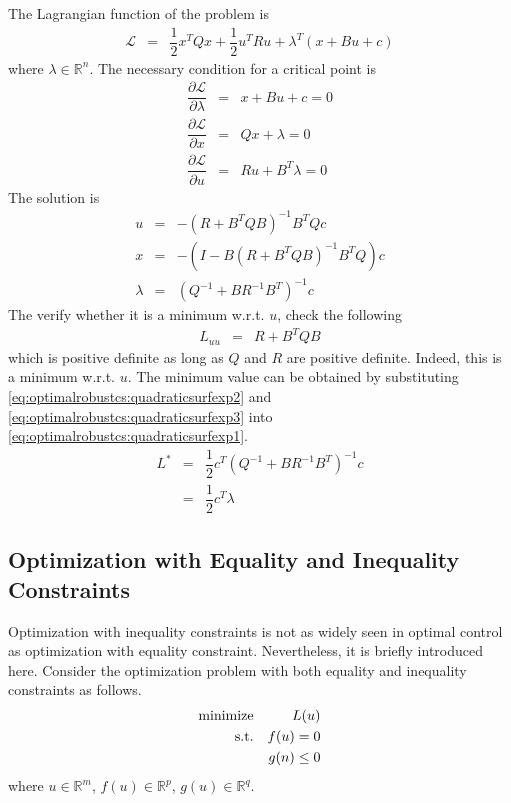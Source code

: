 The Lagrangian function of the problem is
\begin{eqnarray}
  \mathcal{L} &=& \dfrac{1}{2}x^TQx + \dfrac{1}{2}u^TRu + \lambda^T(x + Bu + c) \nonumber
\end{eqnarray}
where $\lambda \in\mathbb{R}^n$. The necessary condition for a critical point is
\begin{eqnarray}
  \dfrac{\partial \mathcal{L}}{\partial \lambda} &=& x + Bu + c = 0 \\
  \dfrac{\partial \mathcal{L}}{\partial x} &=& Qx + \lambda = 0 \\
  \dfrac{\partial \mathcal{L}}{\partial u} &=& Ru + B^T\lambda = 0 \nonumber
\end{eqnarray}
The solution is
\begin{eqnarray}
  u &=& -\left(R+B^TQB\right)^{-1}B^TQc \label{eq:optimalrobustcs:quadraticsurfexp2} \\
  x &=& -\left(I-B\left(R+B^TQB\right)^{-1}B^TQ\right)c \label{eq:optimalrobustcs:quadraticsurfexp3} \\
  \lambda &=& \left(Q^{-1}+BR^{-1}B^T\right)^{-1}c \nonumber
\end{eqnarray}
The verify whether it is a minimum w.r.t. $u$, check the following
\begin{eqnarray}
  L_{uu} &=& R+B^TQB \nonumber
\end{eqnarray}
which is positive definite as long as $Q$ and $R$ are positive definite. Indeed, this is a minimum w.r.t. $u$. The minimum value can be obtained by substituting \eqref{eq:optimalrobustcs:quadraticsurfexp2} and \eqref{eq:optimalrobustcs:quadraticsurfexp3} into \eqref{eq:optimalrobustcs:quadraticsurfexp1}.
\begin{eqnarray}
  L^* &=& \dfrac{1}{2}c^T\left(Q^{-1}+BR^{-1}B^T\right)^{-1}c \nonumber \\
  &=& \dfrac{1}{2}c^T\lambda \nonumber
\end{eqnarray}

\subsection{Optimization with Equality and Inequality Constraints} \label{sec:optimization-lagraigian-eq-ineq}

Optimization with inequality constraints is not as widely seen in optimal control as optimization with equality constraint. Nevertheless, it is briefly introduced here. Consider the optimization problem with both equality and inequality constraints as follows.
\begin{eqnarray}
	\textup{minimize} && L(u) \nonumber \\
	\textup{s.t.} && f(u) = 0 \nonumber \\
    && g(n) \leq 0 \label{eq:optimalrobustcs:inequalityconstraint2}
\end{eqnarray}
where $u\in\mathbb{R}^m$, $f(u)\in\mathbb{R}^p$, $g(u)\in\mathbb{R}^q$.

